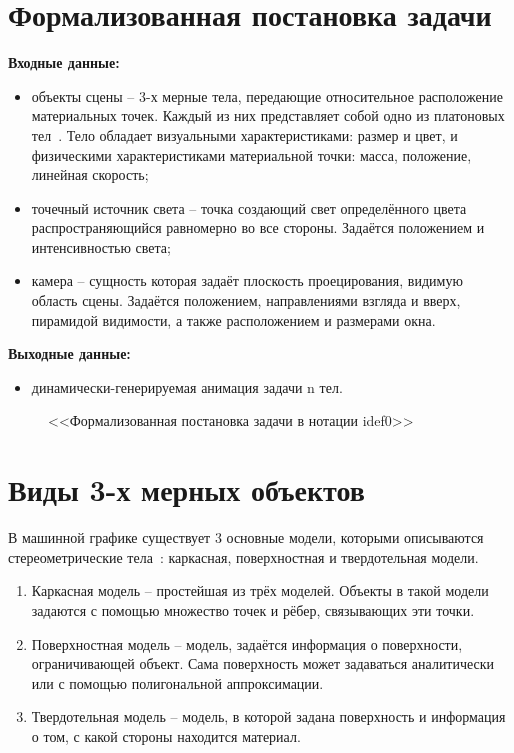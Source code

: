 \section{Формализованная постановка задачи}

\textbf{Входные данные:}
\begin{itemize}
	\item объекты сцены -- 3-х мерные тела, передающие относительное расположение материальных точек.  Каждый из них представляет собой одно из платоновых тел~\cite{platon-body}. Тело обладает визуальными характеристиками: размер и цвет, и физическими характеристиками материальной точки: масса, положение, линейная скорость;
	\item точечный источник света -- точка создающий свет определённого цвета распространяющийся равномерно во все стороны. Задаётся положением и интенсивностью света;
	\item камера -- сущность которая задаёт плоскость проецирования, видимую область сцены. Задаётся положением, направлениями взгляда и вверх, пирамидой видимости, а также расположением и размерами окна.
\end{itemize}
\textbf{Выходные данные:}
\begin{itemize}
	\item динамически-генерируемая анимация задачи n тел.
\end{itemize}

\begin{figure}[H]
	\centering
	
	\caption{<<Формализованная постановка задачи в нотации idef0>>}
	\label{01_a0f}
\end{figure}

\section{Виды 3-х мерных объектов}
В машинной графике существует 3 основные модели, которыми описываются стереометрические тела~\cite{rodgers}: каркасная, поверхностная и твердотельная модели.

\begin{enumerate}
	\item Каркасная модель -- простейшая из трёх моделей. Объекты в такой модели задаются с помощью множество точек и рёбер, связывающих эти точки.
	\item Поверхностная модель -- модель, задаётся информация о поверхности, ограничивающей объект. Сама поверхность может задаваться аналитически или с помощью полигональной аппроксимации.
	\item Твердотельная модель -- модель, в которой задана поверхность и информация о том, с какой стороны находится материал.
\end{enumerate}

